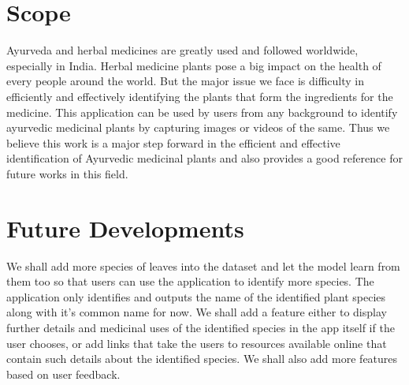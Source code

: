 \section{Scope}
Ayurveda and herbal medicines are greatly used and followed worldwide, especially in India. Herbal medicine plants pose a big impact on the health of every people around the world.  But the major issue we face is difficulty in efficiently and effectively identifying the plants that form the ingredients for the medicine.
This application can be used by users from any background to identify ayurvedic medicinal plants by capturing images or videos of the same.
Thus we believe this work is a major step forward in the efficient and effective identification of Ayurvedic medicinal plants and also provides a good reference for future works in this field.

\section{Future Developments}
We shall add more species of leaves into the dataset and let the model learn from them too so that users can use the application to identify more species. The application only identifies and outputs the name of the identified plant species along with it's common name for now. We shall add a feature either to display further details and medicinal uses of the identified species in the app itself if the user chooses, or add links that take the users to resources available online that contain such details about the identified species. We shall also add more features based on user feedback.



